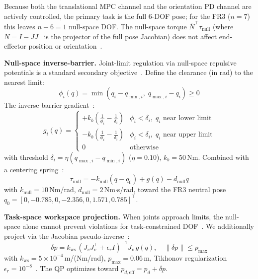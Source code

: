 \documentclass[journal]{IEEEtran}
\newcommand{\Nbar}{\bar{N}}
\begin{document}
Because both the translational MPC channel and the orientation PD channel
are actively controlled, the primary task is the full 6-DOF pose; for the
FR3 ($n=7$) this leaves $n-6=1$ null-space DOF.
The null-space torque $\Nbar^\top\tau_{\text{null}}$ (where
$\Nbar=I-\bar{J}J$~\cite{khatib1987unified,sentis2005synthesis} is the
projector of the full pose Jacobian) does not affect end-effector position
or orientation~\cite{sentis2005synthesis}.

\textbf{Null-space inverse-barrier.}
Joint-limit regulation via null-space repulsive potentials is a standard
secondary objective~\cite{khatib1987unified,sadeghian2014task}.
Define the clearance (in rad) to the nearest limit:
\begin{equation*}
  \phi_i(q) = \min(q_i-q_{\min,i},\;q_{\max,i}-q_i)\ge 0
\end{equation*}
The inverse-barrier gradient~\cite{sadeghian2014task}:
\begin{equation}\label{eq:barrier}
  g_i(q) = \begin{cases}
    +k_b\!\left(\tfrac{1}{\phi_i}-\tfrac{1}{\delta_i}\right)
      & \phi_i<\delta_i,\;q_i\text{ near lower limit}\\
    -k_b\!\left(\tfrac{1}{\phi_i}-\tfrac{1}{\delta_i}\right)
      & \phi_i<\delta_i,\;q_i\text{ near upper limit}\\
    0 & \text{otherwise}
  \end{cases}
\end{equation}
with threshold $\delta_i=\eta(q_{\max,i}-q_{\min,i})$ ($\eta=0.10$),
$k_b=50$\,Nm.
Combined with a centering spring~\cite{sentis2005synthesis}:
\begin{equation}\label{eq:tnull}
  \tau_{\text{null}} = -k_{\text{null}}(q-q_0)+g(q)-d_{\text{null}}\dot{q}
\end{equation}
with $k_{\text{null}}=10$\,Nm/rad, $d_{\text{null}}=2$\,Nm$\cdot$s/rad,
toward the FR3 neutral pose
$q_0=[0,-0.785,0,-2.356,0,1.571,0.785]^\top$.

\textbf{Task-space workspace projection.}
When joints approach limits, the null-space alone cannot prevent
violations for task-constrained DOF~\cite{sadeghian2014task}.
We additionally project via the Jacobian
pseudo-inverse~\cite{khatib1987unified}:
\begin{equation}\label{eq:projection}
  \delta p = k_{\text{ws}}\,(J_vJ_v^\top+\epsilon_r I)^{-1}J_v\,g(q),
  \quad\|\delta p\|\leq p_{\max}
\end{equation}
with $k_{\text{ws}}=5\times10^{-4}$\,m/(Nm/rad), $p_{\max}=0.06$\,m,
Tikhonov regularization $\epsilon_r=10^{-8}$~\cite{siciliano2009robotics}.
The QP optimizes toward $p_{d,\text{eff}}=p_d+\delta p$.
\end{document}
